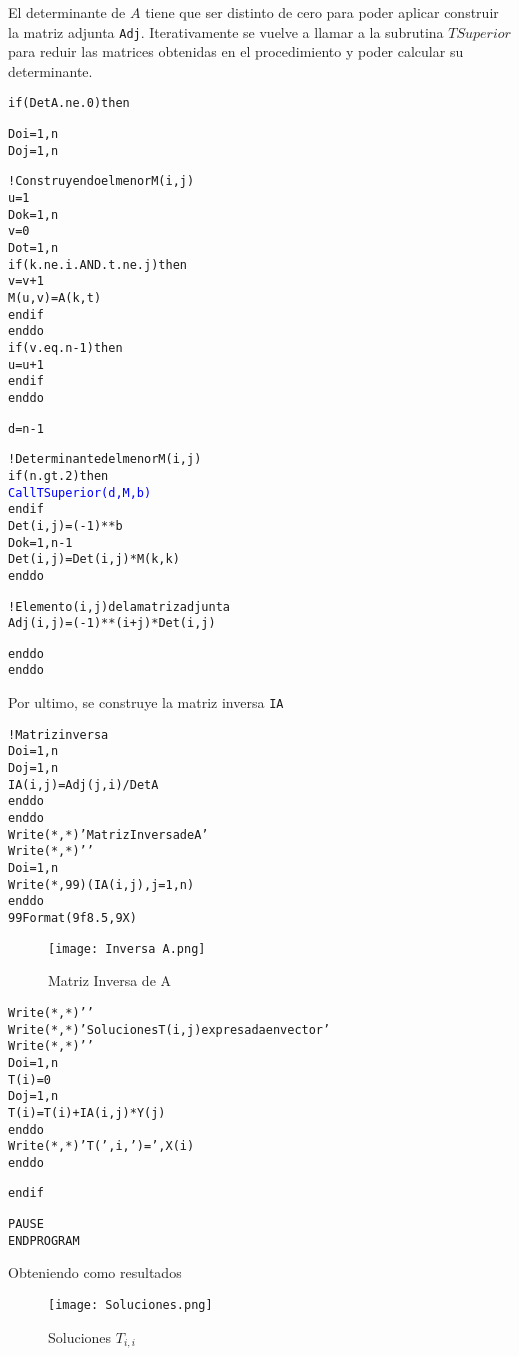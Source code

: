 \documentclass[a4paper]{scrartcl}
\begin{document}
El determinante de $A$ tiene que ser distinto de cero para poder aplicar construir la matriz adjunta \texttt{Adj}. Iterativamente se vuelve a llamar a la subrutina $TSuperior$ para reduir las matrices obtenidas en el procedimiento y poder calcular su determinante. 
\begin{alltt}
      if (DetA.ne.0) then

         Do i = 1, n
            Do j = 1, n

              !Construyendo el menor M(i,j)
               u = 1
               Do k = 1, n
                  v = 0
                  Do t = 1, n
                     if (k.ne.i.AND.t.ne.j) then
                        v = v + 1
                        M(u,v) = A(k,t)
                     end if
                  end do
                  if (v.eq.n-1) then
                     u = u + 1
                  end if
               end do

               d = n - 1

               !Determinante del menor M(i,j)
               if (n.gt.2) then
                  \textcolor{blue}{Call TSuperior(d,M,b)}
               end if
               Det(i,j) = (-1)**b
               Do k = 1, n - 1
                  Det(i,j) = Det(i,j)*M(k,k)
               end do

               !Elemento (i,j) de la matriz adjunta
               Adj(i,j) = (-1)**(i + j)*Det(i,j)

            end do
         end do
\end{alltt}
Por ultimo, se construye la matriz inversa \texttt{IA}
\begin{alltt}
         !Matriz inversa
         Do i = 1, n
            Do j = 1, n
               IA(i,j) = Adj(j,i)/DetA
            end do
         end do
         Write(*,*) ' Matriz Inversa de A'
         Write(*,*) ' '
         Do i = 1, n
            Write(*,99) (IA(i,j), j = 1, n)
         end do
  99     Format(9f8.5,9X)
\end{alltt}
\begin{figure}[h!]
    \centering
    \texttt{[image: Inversa A.png]}
    \caption{Matriz Inversa de A}
    \label{Matriz Inversa de $A$}
\end{figure}
\begin{alltt}

         Write(*,*) ' '
         Write(*,*) 'Soluciones T(i,j) expresada en vector'
         Write(*,*) ' '
         Do i = 1, n
            T(i) = 0
            Do j = 1, n
               T(i) = T(i) +  IA(i,j)*Y(j)
            end do
            Write(*,*) 'T(',i,') =',X(i)
         end do
         
      end if

      PAUSE
      END PROGRAM
\end{alltt}
Obteniendo como resultados
\begin{figure}[h!]
    \centering
    \texttt{[image: Soluciones.png]}
    \caption{Soluciones $T_{i,i}$}
\end{figure}
\end{document}
